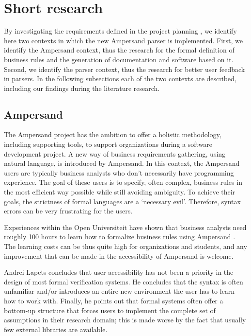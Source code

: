 
\section{Short research}
\label{sec:research}
By investigating the requirements defined in the project planning , we identify here two contexts in which the new Ampersand parser is implemented.
First, we identify the Ampersand context, thus the research for the formal definition of business rules and the generation of documentation and software based  on it.
Second, we identify the parser context, thus the research for better user feedback in parsers.
In the following subsections each of the two contexts are described, including our findings during the literature research.

\subsection{Ampersand}
The Ampersand project has the ambition to offer a holistic methodology, including supporting tools, to support organizations during a software development project.
A new way of business requirements gathering, using natural language, is introduced by Ampersand.
In this context, the Ampersand users are typically business analysts who don't necessarily have programming experience.
The goal of these users is to specify, often complex, business rules in the most efficient way possible while still avoiding ambiguity.
To achieve their goals, the strictness of formal languages are a `necessary evil'.
Therefore, syntax errors can be very frustrating for the users.

Experiences within the Open Universiteit have shown that business analysts need roughly 100 hours to learn how to formalize business rules using Ampersand .
The learning costs can be thus quite high for organizations and students, and any improvement that can be made in the accessibility of Ampersand is welcome.

Andrei Lapets  concludes that user accessibility has not been a priority in the design of most formal verification systems.
He concludes that the syntax is often unfamiliar and/or introduces an entire new environment the user has to learn how to work with.
Finally, he points out that formal systems often offer a bottom-up structure that forces users to implement the complete set of assumptions in their research domain; this is made worse by the fact that usually few external libraries are available.

